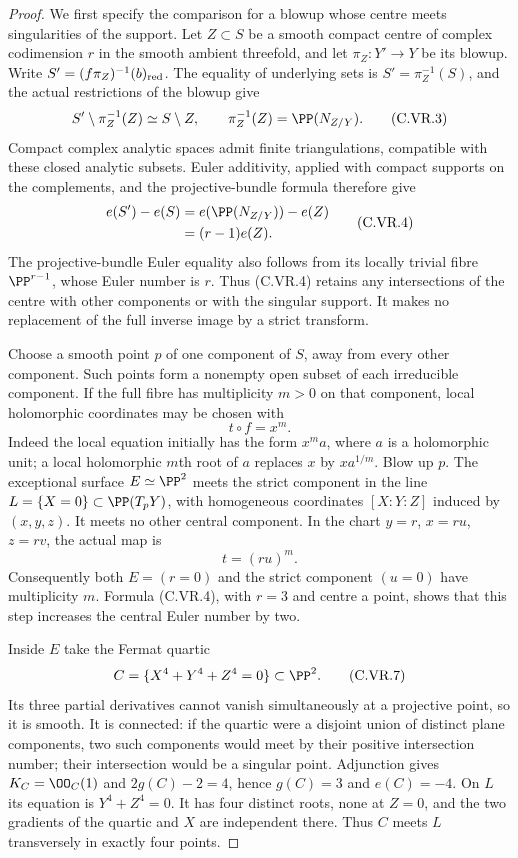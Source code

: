 \begin{proof}
We first specify the comparison for a blowup whose centre meets
singularities of the support. Let $Z\subset S$ be a smooth compact
centre of complex codimension $r$ in the smooth ambient threefold,
and let $\pi_Z:Y'\to Y$ be its blowup. Write $S'=(f\pi_Z)^{-1}(b)_{\rm red}$.
The equality of underlying sets is $S'=\pi_Z^{-1}(S)$, and the actual
restrictions of the blowup give
\[
 S'\setminus\pi_Z^{-1}(Z)\simeq S\setminus Z,
 \qquad \pi_Z^{-1}(Z)=\PP(N_{Z/Y}).                \tag{C.VR.3}
\]
Compact complex analytic spaces admit finite triangulations, compatible
with these closed analytic subsets. Euler additivity, applied with
compact supports on the complements, and the projective-bundle
formula therefore give
\[
 \begin{split}
 e(S')-e(S)
 &=e(\PP(N_{Z/Y}))-e(Z)\\
 &=(r-1)e(Z).
 \end{split}                                      \tag{C.VR.4}
\]
The projective-bundle Euler equality also follows from its locally
trivial fibre $\PP^{r-1}$, whose Euler number is $r$.
Thus (C.VR.4) retains any intersections of the centre with other
components or with the singular support. It makes no replacement of
the full inverse image by a strict transform.

Choose a smooth point $p$ of one component of $S$, away from every
other component. Such points form a nonempty open subset of each
irreducible component. If the full fibre has multiplicity $m>0$ on
that component, local holomorphic coordinates may be chosen with
\[
                    t\circ f=x^m.                \tag{C.VR.5}
\]
Indeed the local equation initially has the form $x^m a$, where $a$
is a holomorphic unit; a local holomorphic $m$th root of $a$ replaces
$x$ by $x a^{1/m}$. Blow up $p$. The exceptional surface
$E\simeq\PP^2$ meets the strict component in the line
$L=\{X=0\}\subset\PP(T_pY)$, with homogeneous coordinates
$[X:Y:Z]$ induced by $(x,y,z)$. It meets no other central component.
In the chart $y=r$, $x=ru$, $z=rv$, the actual map is
\[
                         t=(ru)^m.                \tag{C.VR.6}
\]
Consequently both $E=(r=0)$ and the strict component $(u=0)$
have multiplicity $m$. Formula (C.VR.4), with $r=3$ and centre a
point, shows that this step increases the central Euler number by two.

Inside $E$ take the Fermat quartic
\[
 C=\{X^4+Y^4+Z^4=0\}\subset\PP^2.                \tag{C.VR.7}
\]
Its three partial derivatives cannot vanish simultaneously at a
projective point, so it is smooth. It is connected: if the quartic
were a disjoint union of distinct plane components, two such
components would meet by their positive intersection number; their
intersection would be a singular point. Adjunction gives
$K_C=\OO_C(1)$ and $2g(C)-2=4$, hence $g(C)=3$ and $e(C)=-4$.
On $L$ its equation is $Y^4+Z^4=0$. It has four distinct roots,
none at $Z=0$, and the two gradients of the quartic and $X$ are
independent there. Thus $C$ meets $L$ transversely in exactly four
points.


\end{proof}
